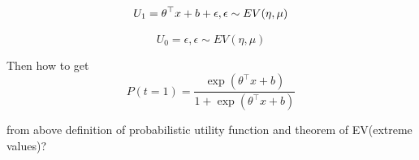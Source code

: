 \documentclass[a4paper,10pt]{article}
\newcommand{\tran}{^{\top}}
\begin{document}
\begin{equation}
    U_{1} = \theta\tran x + b + \epsilon, \epsilon \sim EV(\eta,\mu)\\
\end{equation}

\begin{equation*}
    U_{0}= \epsilon , \epsilon \sim EV(\eta,\mu)
\end{equation*}

Then how to get 
\begin{equation}
 P(t=1) = \frac{\exp(\theta\tran x + b)}{1+\exp(\theta\tran x + b)} 
\end{equation}

from above definition of probabilistic utility function and theorem of EV(extreme values)?\\



\medskip


\end{document}
